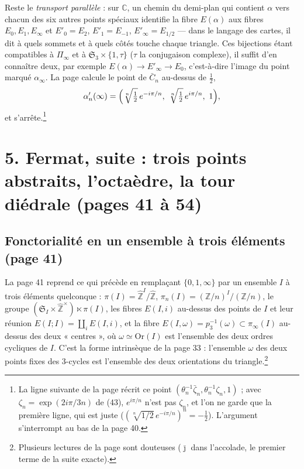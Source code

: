 \documentclass[11pt,a4paper]{article}
\begin{document}
Reste le \emph{transport parallèle} : sur $\mathbb{C}$, un chemin du demi-plan
qui contient $\alpha$ vers chacun des six autres points spéciaux identifie la
fibre $E(\alpha)$ aux fibres $E_{0}, E_{1}, E_{\infty}$ et $E'_{0} = E_{2}$,
$E'_{1} = E_{-1}$, $E'_{\infty} = E_{1/2}$ --- dans le langage des cartes, il dit
à quels sommets et à quels côtés touche chaque triangle. Ces bijections étant
compatibles à $\Pi_{\infty}$ et à $\mathfrak{S}_{3} \times \{1, \tau\}$ ($\tau$ la
conjugaison complexe), il suffit d'en connaître deux, par exemple $E(\alpha) \to
E'_{\infty} \to E_{0}$, c'est-à-dire l'image du point marqué $\alpha_{\infty}$.
La page calcule le point de $\bar{C}_{n}$ au-dessus de $\tfrac12$,
\[
\alpha'_{n}(\infty) = \Bigl(\sqrt[n]{\tfrac12}\, e^{-i\pi/n},\
\sqrt[n]{\tfrac12}\, e^{i\pi/n},\ 1\Bigr),
\]
et s'arrête.\footnote{La ligne suivante de la page récrit ce point
$(\theta_{n}^{-1}\bar{\zeta}_{n}, \theta_{n}^{-1}\zeta_{n}, 1)$ ; avec
$\zeta_{n} = \exp(2i\pi/3n)$ de (43), $e^{i\pi/n}$ n'est pas $\zeta_{n}$, et
l'on ne garde que la première ligne, qui est juste ($(\sqrt[n]{1/2}\,
e^{-i\pi/n})^{n} = -\tfrac12$). L'argument s'interrompt au bas de la page 40.}

\section*{5. Fermat, suite : trois points abstraits, l'octaèdre, la tour diédrale
(pages 41 à 54)}

\subsection*{Fonctorialité en un ensemble à trois éléments (page 41)}

La page 41 reprend ce qui précède en remplaçant $\{0, 1, \infty\}$ par un
ensemble $I$ à trois éléments quelconque : $\pi(I) =
\widehat{\mathbb{Z}}^{I}/\widehat{\mathbb{Z}}$, $\pi_{n}(I) =
(\mathbb{Z}/n)^{I}/(\mathbb{Z}/n)$, le groupe $(\mathfrak{S}_{I} \times
\widehat{\mathbb{Z}}^{\times}) \ltimes \pi(I)$, les fibres $E(I, i)$ au-dessus
des points de $I$ et leur réunion $E(I; I) = \coprod_{i} E(I, i)$, et la fibre
$E(I, \omega) = p_{3}^{-1}(\omega) \subset \pi_{\infty}(I)$ au-dessus des deux
« centres », où $\omega \simeq \mathrm{Or}(I)$ est l'ensemble des deux ordres
cycliques de $I$. C'est la forme intrinsèque de la page 33 : l'ensemble
$\omega$ des deux points fixes des 3-cycles est l'ensemble des deux
orientations du triangle.\footnote{Plusieurs lectures de la page sont
douteuses ($\bar{\jmath}$ dans l'accolade, le premier terme de la suite
exacte).}
\end{document}

